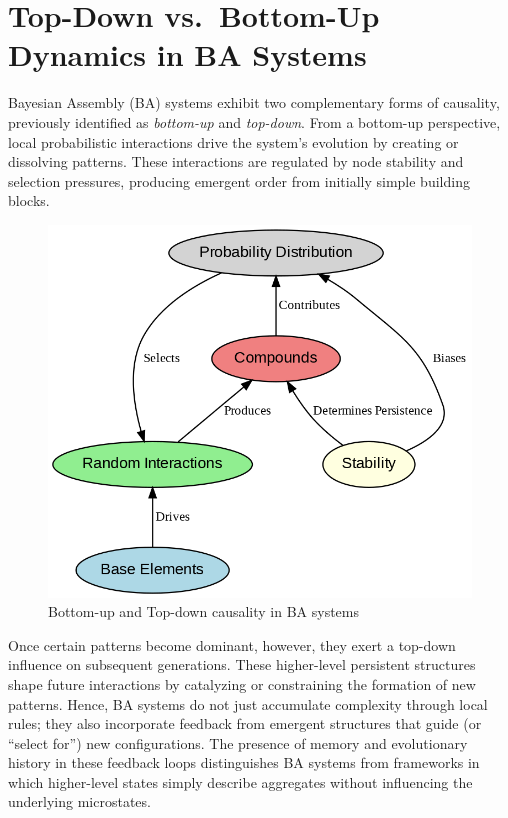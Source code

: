 \documentclass[entropy,article,submit,pdftex,moreauthors]{Definitions/mdpi}
\begin{document}
\section{Top-Down vs.\ Bottom-Up Dynamics in BA Systems}
\label{sec:topdown-bottomup}

Bayesian Assembly (BA) systems exhibit two complementary forms of causality, previously identified as \emph{bottom-up} and \emph{top-down}. From a bottom-up perspective, local probabilistic interactions drive the system's evolution by creating or dissolving patterns. These interactions are regulated by node stability and selection pressures, producing emergent order from initially simple building blocks. 

\begin{figure}[h]
    \centering
    \includegraphics[width=0.7\linewidth,height=0.7\linewidth]{images/ba_topdown.png}
    \caption{Bottom-up and Top-down causality in BA systems}
    \label{fig:ba_topdown}
\end{figure}

Once certain patterns become dominant, however, they exert a top-down influence on subsequent generations. These higher-level persistent structures shape future interactions by catalyzing or constraining the formation of new patterns. Hence, BA systems do not just accumulate complexity through local rules; they also incorporate feedback from emergent structures that guide (or ``select for'') new configurations. The presence of memory and evolutionary history in these feedback loops distinguishes BA systems from frameworks in which higher-level states simply describe aggregates without influencing the underlying microstates.
\end{document}
